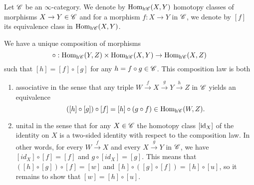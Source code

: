 \documentclass[../../thesis.tex]{subfiles}
\begin{document}
\begin{definition}\label{homhtpycat}
    Let $\mathscr{C}$ be an $\infty$-category.
    We denote by $\mathrm{Hom}_{\mathrm{h}\mathscr{C}}(X,Y)$ homotopy classes of morphisms $X\to Y \in \mathscr{C}$ and for a morphism $f : X \to Y$ in $\mathscr{C}$, we denote by $[f]$ its equivalence class in $\mathrm{Hom}_{\mathrm{h}\mathscr{C}}(X,Y)$.
\end{definition}
\begin{proposition}
    We have a unique composition of morphisms
    \[
        \circ : \mathrm{Hom}_{\mathrm{h}\mathscr{C}}(Y, Z) \times \mathrm{Hom}_{\mathrm{h}\mathscr{C}}(X, Y) \rightarrow \mathrm{Hom}_{\mathrm{h}\mathscr{C}}(X, Z)
    \]
    such that $[h] = [f] \circ [g]$ for any $h = f\circ g \in \mathscr{C}$.
    This composition law is both
    \begin{enumerate}
        \item associative in the sense that any triple $W\xrightarrow{f}X\xrightarrow{g}Y\xrightarrow{h}Z$ in $\mathscr{C}$ yields an equivalence
              \[
                  ([h] \circ [g])\circ [f] = [h] \circ (g \circ f) \in \mathrm{Hom}_{\mathrm{h}\mathscr{C}}(W,Z).
              \]
        \item unital in the sense that for any $X\in \mathscr{C}$ the homotopy class $[\operatorname{id}_X]$ of the identity on $X$ is a two-sided identity with respect to the composition law.
              In other words, for every $W\xrightarrow{f}X$ and every $X\xrightarrow{g}Y$ in $\mathscr{C}$, we have $[id_X] \circ [f] = [f]$ and $g\circ [id_X] = [g]$.
              This means that $([h]\circ [g])\circ [f] = [w]$ and $[h] \circ ([g]\circ [f]) = [h]\circ [u]$, so it remains to show that $[w] = [h] \circ [u]$.
    \end{enumerate}
\end{proposition}
\end{document}
